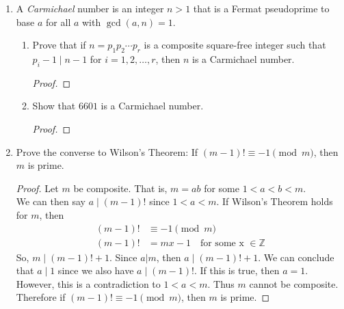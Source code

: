 \documentclass[11pt]{article}
\theoremstyle{definition}
\newcommand{\ZZ}{\mathbb{Z}}
\begin{document}
\begin{enumerate}
\begin{enumerate}
            \item Prove that if $n$ is a Fermat pseudoprime to base $2$, then $M_n = 2^n - 1$ is also a Fermat pseudoprime to base $2$.
            \begin{proof}
                If $n\mid 2^{n-1}-1$, then $2^{n-1}-1 = nx$ for some $x\in\ZZ$. 
            \end{proof}

            \item Conclude that there are infinitely many Fermat pseudoprimes to base $2$.
            \begin{proof}
                
            \end{proof}
        \end{enumerate}
    
    \item A \emph{Carmichael} number is an integer $n>1$ that is a Fermat pseudoprime to base $a$ for all $a$ with $\gcd(a,n) = 1$.
    \begin{enumerate}
        \item Prove that if $n=p_1p_2\cdots p_r$ is a composite square-free integer such that $p_i-1\mid n-1$ for $i=1,2,\dots,r$, then $n$ is a Carmichael number.
        \begin{proof}
            
        \end{proof}

        \item Show that $6601$ is a Carmichael number.
        \begin{proof}
            
        \end{proof}
    \end{enumerate}

    \item Prove the converse to Wilson's Theorem: If $(m-1)! \equiv -1 \pmod m$, then $m$ is prime.
    \begin{proof}
        Let $m$ be composite. That is, $m=ab$ for some $1<a<b<m$. \\
        We can then say $a\mid (m-1)!$ since $1<a<m$. 
        If Wilson's Theorem holds for $m$, then
        \begin{align*}
            (m-1)! &\equiv -1\pmod{m} \\
            (m-1)! &= mx-1 \quad\text{for some x }\in\ZZ
        \end{align*}
        So, $m \mid (m-1)!+1$. Since $a|m$, then $a \mid (m-1)!+1$. 
        We can conclude that $a\mid 1$ since we also have $a\mid (m-1)!$. 
        If this is true, then $a=1$.
        However, this is a contradiction to $1<a<m$. Thus $m$ cannot be composite. 
        Therefore if $(m-1)! \equiv -1 \pmod m$, then $m$ is prime.
    \end{proof}

\end{enumerate}
\end{document}

